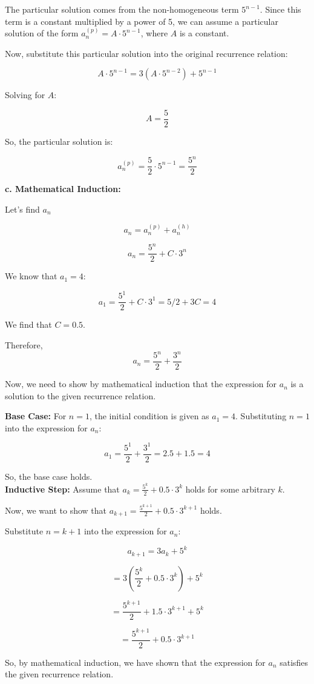 \documentclass[12pt]{article}
\begin{document}
The particular solution comes from the non-homogeneous term \(5^{n-1}\). Since this term is a constant multiplied by a power of 5, we can assume a particular solution of the form \(a_n^{(p)} = A \cdot 5^{n-1}\), where \(A\) is a constant.

Now, substitute this particular solution into the original recurrence relation:

\[A \cdot 5^{n-1} = 3(A \cdot 5^{n-2}) + 5^{n-1}\]

Solving for \(A\):

\[A = \frac{5}{2}\]

So, the particular solution is:

\[a_n^{(p)} = \frac{5}{2} \cdot 5^{n-1} = \frac{5^n}{2}\]

\textbf{c. Mathematical Induction:}

Let's find \(a_n\)

\[a_n = a_n^{(p)} + a_n^{(h)} \]

\[a_n = \frac{5^n}{2} + C \cdot 3^n \]

We know that \(a_1 = 4\):

\[a_1 = \frac{5^1}{2} + C \cdot 3^1 = 5/2 + 3C = 4\]

We find that \(C=0.5\).

Therefore, \[a_n = \frac{5^n}{2} + \frac{3^n}{2} \]

Now, we need to show by mathematical induction that the expression for \(a_n\) is a solution to the given recurrence relation.

\textbf{Base Case:}
For \(n = 1\), the initial condition is given as \(a_1 = 4\). Substituting \(n = 1\) into the expression for \(a_n\):

\[a_1 = \frac{5^1}{2} + \frac{3^1}{2} = 2.5 + 1.5 = 4\]

So, the base case holds. \\

\textbf{Inductive Step:}
Assume that \(a_k = \frac{5^k}{2} + 0.5 \cdot 3^k\) holds for some arbitrary \(k\).

Now, we want to show that \(a_{k+1} = \frac{5^{k+1}}{2} + 0.5 \cdot 3^{k+1}\) holds.

Substitute \(n = k+1\) into the expression for \(a_n\):

\[a_{k+1} = 3a_k + 5^k\]

\[= 3\left(\frac{5^k}{2} + 0.5 \cdot 3^k\right) + 5^k\]

\[= \frac{5^{k+1}}{2} + 1.5 \cdot 3^{k+1} + 5^k\]

\[= \frac{5^{k+1}}{2} + 0.5 \cdot 3^{k+1}\]

So, by mathematical induction, we have shown that the expression for \(a_n\) satisfies the given recurrence relation.
\end{document}
